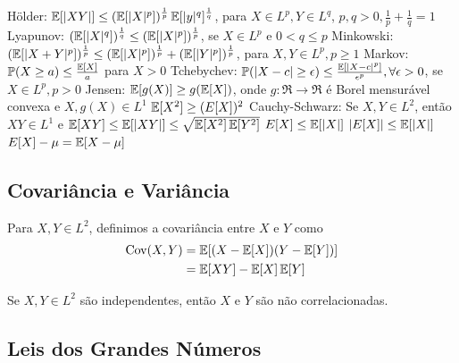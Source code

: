 \begin{theorem}
	\leavevmode
	\begin{outline}[enumerate]
		\1 Hölder: $\operatorname{\mathbb{E}}[|XY|]\leq (\operatorname{\mathbb{E}}[|X|^p])^\frac{1}{p}\operatorname{\mathbb{E}}[|y|^q]^\frac{1}{q}$, para $X\in L^p, Y\in L^q$,  $p,q>0, \frac{1}{p}+\frac{1}{q}=1$
		\1 Lyapunov: $(\operatorname{\mathbb{E}}[|X|^q])^\frac{1}{q} \leq (\operatorname{\mathbb{E}}[|X|^p])^\frac{1}{p}$, se $X \in L^p$ e $0<q\leq p$
		\1 Minkowski: $(\operatorname{\mathbb{E}}[|X+Y|^p])^\frac{1}{p} \leq (\operatorname{\mathbb{E}}[|X|^p])^\frac{1}{p} + (\operatorname{\mathbb{E}}[|Y|^p])^\frac{1}{p}$, para $X,Y \in L^p, p\geq1$
		\1 Markov: $\mathbb{P}(X\geq a) \leq \frac{\operatorname{\mathbb{E}}[X]}{a}$ para $X>0$
		\1 Tchebychev: $\mathbb{P}(|X-c|\geq\epsilon) \leq \frac{\operatorname{\mathbb{E}}[|X-c|^p]}{\epsilon^p}, \forall \epsilon>0$, se $X\in L^p, p>0$
		\1 Jensen: $\operatorname{\mathbb{E}}[g(X)]\geq g(\operatorname{\mathbb{E}}[X])$, onde $g: \Re\to\Re$ é Borel mensurável convexa e $X,g(X)\in L^1$
			\2 \(\operatorname{\mathbb{E}}[X^2] \geq (E[X])^2 \)
		\1 Cauchy-Schwarz: Se $X,Y\in L^2$, então $XY \in L^1$ e $\operatorname{\mathbb{E}}[XY] \leq \operatorname{\mathbb{E}}[|XY|] \leq \sqrt{\operatorname{\mathbb{E}}[X^2]\operatorname{\mathbb{E}}[Y^2]}$
		\1 \(E[X] \leq \operatorname{\mathbb{E}}[|X|]\)
		\1 \(|E[X]|\leq \operatorname{\mathbb{E}}[|X|]\)
		\1 \( E[X]-\mu =\operatorname{\mathbb{E}}[X-\mu]\)
	\end{outline}
\end{theorem}

\subsection{Covariância e Variância}

\begin{definition}
	Para $X,Y \in L^2$, definimos a covariância entre $X$ e $Y$ como
	\begin{align}
		\operatorname{Cov}(X,Y) &= \operatorname{\mathbb{E}}[(X-\operatorname{\mathbb{E}}[X])(Y-\operatorname{\mathbb{E}}[Y])] \\
		&= \operatorname{\mathbb{E}}[XY]-\operatorname{\mathbb{E}}[X]\operatorname{\mathbb{E}}[Y]
	\end{align}
	\begin{note}
		Se $X,Y\in L^2$ são independentes, então $X$ e $Y$ são não correlacionadas.
	\end{note}
\end{definition}

\subsection{Leis dos Grandes Números}

